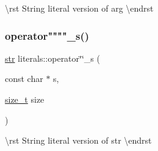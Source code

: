 \textbackslash{}rst String literal version of {\ttfamily arg} \textbackslash{}endrst \mbox{\label{namespaceliterals_a8f086b5001169e61bd9260ee9f6978f9}} 
\subsubsection{\texorpdfstring{operator""""\_s()}{operator""\_s()}}
{\footnotesize\ttfamily \mbox{\hyperlink{classstr}{str}} literals\+::operator\char`\"{}\char`\"{}\+\_\+s (\begin{DoxyParamCaption}\item[{const char $\ast$}]{s,  }\item[{\mbox{\hyperlink{detail_2common_8h_a801d6a451a01953ef8cbae6feb6a3638}{size\+\_\+t}}}]{size }\end{DoxyParamCaption})\hspace{0.3cm}{\ttfamily [inline]}}

\textbackslash{}rst String literal version of {\ttfamily str} \textbackslash{}endrst 